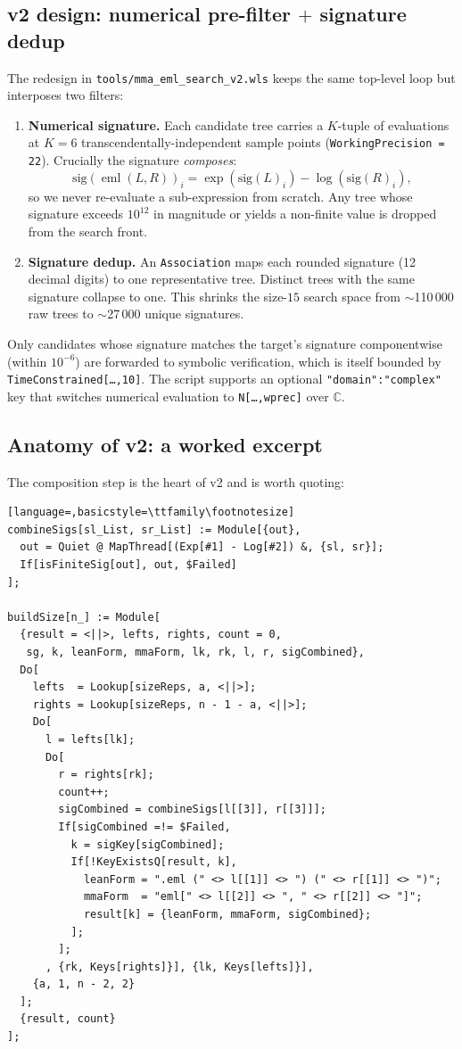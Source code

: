 \documentclass[11pt,a4paper]{article}
\theoremstyle{plain}
\theoremstyle{definition}
\newcommand{\eml}{\operatorname{eml}}
\newcommand{\C}{\mathbb{C}}
\begin{document}
\subsection{v2 design: numerical pre-filter $+$ signature dedup}

The redesign in \texttt{tools/mma\_eml\_search\_v2.wls} keeps the same
top-level loop but interposes two filters:

\begin{enumerate}[leftmargin=*]
\item \textbf{Numerical signature.}  Each candidate tree carries a
$K$-tuple of evaluations at $K=6$ transcendentally-independent sample
points (\texttt{WorkingPrecision\,=\,22}).  Crucially the signature
\emph{composes}:
\[
   \mathrm{sig}(\eml(L,R))_i = \exp(\mathrm{sig}(L)_i) - \log(\mathrm{sig}(R)_i),
\]
so we never re-evaluate a sub-expression from scratch.  Any tree whose
signature exceeds $10^{12}$ in magnitude or yields a non-finite value is
dropped from the search front.
\item \textbf{Signature dedup.}  An \texttt{Association}
maps each rounded signature (12 decimal digits) to one
representative tree.  Distinct trees with the same signature collapse to
one.  This shrinks the size-$15$ search space from $\sim$110\,000 raw
trees to $\sim$27\,000 unique signatures.
\end{enumerate}

Only candidates whose signature matches the target's signature
componentwise (within $10^{-6}$) are forwarded to symbolic verification,
which is itself bounded by \texttt{TimeConstrained[\dots,10]}.  The
script supports an optional \texttt{"domain":"complex"} key that
switches numerical evaluation to \texttt{N[\dots,wprec]} over $\C$.

\subsection{Anatomy of v2: a worked excerpt}

The composition step is the heart of v2 and is worth quoting:

\begin{lstlisting}[language=,basicstyle=\ttfamily\footnotesize]
combineSigs[sl_List, sr_List] := Module[{out},
  out = Quiet @ MapThread[(Exp[#1] - Log[#2]) &, {sl, sr}];
  If[isFiniteSig[out], out, $Failed]
];

buildSize[n_] := Module[
  {result = <||>, lefts, rights, count = 0,
   sg, k, leanForm, mmaForm, lk, rk, l, r, sigCombined},
  Do[
    lefts  = Lookup[sizeReps, a, <||>];
    rights = Lookup[sizeReps, n - 1 - a, <||>];
    Do[
      l = lefts[lk];
      Do[
        r = rights[rk];
        count++;
        sigCombined = combineSigs[l[[3]], r[[3]]];
        If[sigCombined =!= $Failed,
          k = sigKey[sigCombined];
          If[!KeyExistsQ[result, k],
            leanForm = ".eml (" <> l[[1]] <> ") (" <> r[[1]] <> ")";
            mmaForm  = "eml[" <> l[[2]] <> ", " <> r[[2]] <> "]";
            result[k] = {leanForm, mmaForm, sigCombined};
          ];
        ];
      , {rk, Keys[rights]}], {lk, Keys[lefts]}],
    {a, 1, n - 2, 2}
  ];
  {result, count}
];
\end{lstlisting}
\end{document}
